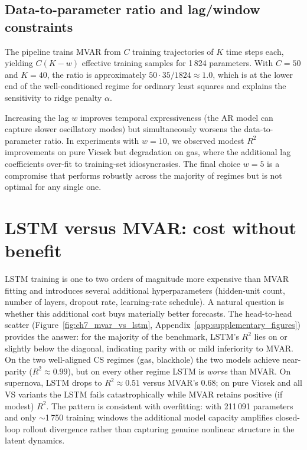 \subsection{Data-to-parameter ratio and lag/window constraints}

The pipeline trains MVAR from $C$ training trajectories of
$K$ time steps each, yielding $C(K-w)$ effective training samples for
1\,824 parameters.  With $C=50$ and $K=40$, the ratio is approximately
$50\cdot 35/1824\approx 1.0$, which is at the lower end of the
well-conditioned regime for ordinary least squares and explains the
sensitivity to ridge penalty $\alpha$.

Increasing the lag $w$ improves temporal expressiveness (the AR model can
capture slower oscillatory modes) but simultaneously worsens the
data-to-parameter ratio.  In experiments with $w{=}10$, we observed
modest $R^2$ improvements on pure Vicsek but degradation on gas, where
the additional lag coefficients over-fit to training-set idiosyncrasies.
The final choice $w{=}5$ is a compromise that performs robustly
across the majority of regimes but is not optimal for any single one.

\section{LSTM versus MVAR: cost without benefit}
\label{sec:ch7_lstm_modes}

LSTM training is one to two orders of magnitude more expensive than MVAR
fitting and introduces several additional hyperparameters (hidden-unit
count, number of layers, dropout rate, learning-rate schedule).  A natural
question is whether this additional cost buys materially better forecasts.
The head-to-head scatter (Figure~\ref{fig:ch7_mvar_vs_lstm},
Appendix~\ref{app:supplementary_figures}) provides the
answer: for the majority of the benchmark, LSTM's $R^2$ lies on or
slightly below the diagonal, indicating parity with or mild inferiority
to MVAR\@.  On the two well-aligned CS regimes (gas, blackhole) the two
models achieve near-parity ($R^2\approx 0.99$), but on every other regime
LSTM is \emph{worse} than MVAR\@.  On supernova, LSTM drops to
$R^2\approx 0.51$ versus MVAR's $0.68$; on pure Vicsek and all VS
variants the LSTM fails catastrophically while MVAR retains positive
(if modest) $R^2$.
The pattern is consistent with overfitting: with 211\,091 parameters and
only $\sim$1\,750 training windows the additional model capacity amplifies
closed-loop rollout divergence rather than capturing genuine nonlinear
structure in the latent dynamics.

